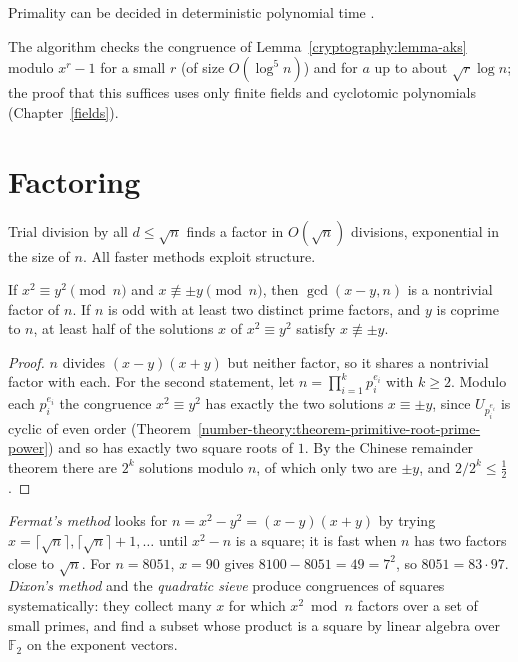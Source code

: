 \begin{theorem}\label{cryptography:theorem-aks}
Primality can be decided in deterministic polynomial time \cite{agrawal-kayal-saxena}.
\end{theorem}

The algorithm checks the congruence of Lemma~\ref{cryptography:lemma-aks} modulo $x^r - 1$ for a small $r$ (of size $O(\log^5n)$) and for $a$ up to about $\sqrt r\log n$; the proof that this suffices uses only
finite fields and cyclotomic polynomials (Chapter~\ref{fields}).

\section{Factoring}\label{cryptography:section-factoring}

Trial division by all $d \leq \sqrt n$ finds a factor in $O(\sqrt n)$ divisions, exponential in the size of $n$. All faster methods exploit structure.

\begin{lemma}\label{cryptography:lemma-squares}
If $x^2 \equiv y^2 \pmod n$ and $x \not\equiv \pm y \pmod n$, then $\gcd(x - y, n)$ is a nontrivial factor of $n$. If $n$ is odd with at least two distinct prime factors, and $y$ is coprime to $n$, at least half of
the solutions $x$ of $x^2 \equiv y^2$ satisfy $x \not\equiv \pm y$.
\end{lemma}

\begin{proof}
$n$ divides $(x - y)(x + y)$ but neither factor, so it shares a nontrivial factor with each. For the second statement, let $n = \prod_{i=1}^kp_i^{e_i}$ with $k \geq 2$. Modulo each $p_i^{e_i}$ the
congruence $x^2 \equiv y^2$ has exactly the two solutions $x \equiv \pm y$, since $U_{p_i^{e_i}}$ is cyclic of even order (Theorem~\ref{number-theory:theorem-primitive-root-prime-power}) and so has exactly two
square roots of $1$. By the Chinese remainder theorem there are $2^k$ solutions modulo $n$, of which only two are $\pm y$, and $2/2^k \leq \frac12$.
\end{proof}

\begin{example}\label{cryptography:example-fermat-factoring}
\emph{Fermat's method} looks for $n = x^2 - y^2 = (x - y)(x + y)$ by trying $x = \lceil\sqrt n\rceil, \lceil\sqrt n\rceil + 1, \dots$ until $x^2 - n$ is a square; it is fast when $n$ has two factors close to $\sqrt n$. For
$n = 8051$, $x = 90$ gives $8100 - 8051 = 49 = 7^2$, so $8051 = 83 \cdot 97$. \emph{Dixon's method} and the \emph{quadratic sieve} produce congruences of squares systematically: they collect many $x$ for which
$x^2 \bmod n$ factors over a set of small primes, and find a subset whose product is a square by linear algebra over $\mathbb{F}_2$ on the exponent vectors.
\end{example}

